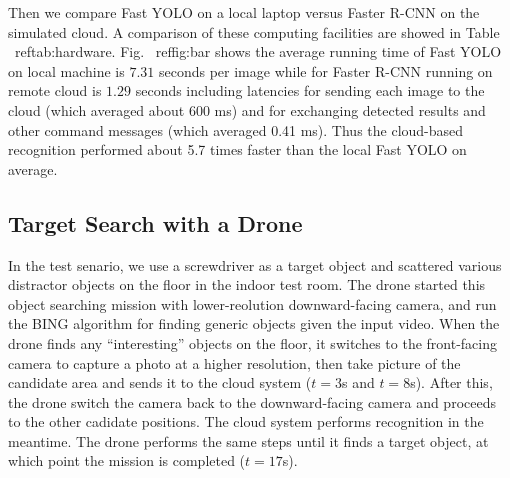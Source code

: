 Then we compare Fast YOLO on a local laptop versus Faster R-CNN on the simulated cloud. A comparison of these computing facilities are showed in Table ~ref{tab:hardware}. Fig. ~ref{fig:bar} shows the average running time of Fast YOLO on local machine is $7.31$ seconds per image while for Faster R-CNN running on remote cloud is $1.29$ seconds including latencies for sending each image to the cloud (which averaged about 600 ms) and for exchanging detected results and other command messages (which averaged 0.41 ms). Thus the cloud-based recognition performed about 5.7 times faster than the local Fast YOLO on average.

\subsection{Target Search with a Drone}
In the test senario, we use a screwdriver as a target object and scattered various distractor objects on the floor in the indoor test room. 
The drone started this object searching mission with lower-reolution downward-facing camera, and run the BING algorithm for finding generic objects given the input video.
When the drone finds any ``interesting'' objects on the floor, it switches to the front-facing camera to capture a photo at a higher resolution, then take picture of the candidate area and sends it to the cloud system ($t=3$s and $t=8$s).
After this, the drone switch the camera back to the downward-facing camera and proceeds to the other cadidate positions. The cloud system performs recognition in the meantime.
The drone performs the same steps until it finds a target object, at which point the mission is completed ($t=17$s).

